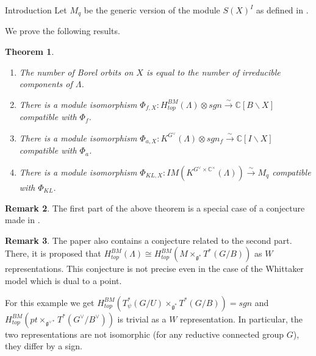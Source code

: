 \documentclass[12pt]{article}
\newcommand{\C}{\mathbb{C}}
\newcommand{\<}{\langle}
\renewcommand{\>}{\rangle}
\theoremstyle{plain}
\newtheorem{theorem}{Theorem}[section]
\theoremstyle{definition}
\newtheorem{Remark}[theorem]{Remark}
\begin{document}
\begin{section}{Introduction}
        Let $M_q$ be the generic version of the module $S(X)^I $ as defined in \cite{my}.
        
        We prove the following results.

        \begin{theorem}\label{relative KL}
            \begin{enumerate}
    \item The number of Borel orbits on $X$ is equal to the number of irreducible components of $\Lambda$.
    
    \item There is a module isomorphism $\Phi_{f,X}:H^{BM}_{top}(\Lambda) \otimes sgn\xrightarrow{\sim} \mathbb{C}[B\backslash X]$ compatible with $\Phi_f$.
    
    \item There is a module isomorphism $\Phi_{a,X}:K^{G^\vee}(\Lambda) \otimes sgn_f\xrightarrow{\sim} \C[I\backslash X]$ compatible with $\Phi_a$. 

    
    \item 
    
    There is a module isomorphism $\Phi_{KL,X}:IM(K^{G^\vee\times\mathbb{C}^\times}(\Lambda))\xrightarrow{\sim} M_q$ compatible with $\Phi_{KL}$. 
\end{enumerate}
        \end{theorem}

       

\begin{Remark}
    The first part of the above theorem is a special case of a conjecture made in \cite{finkelberg2023lagrangiansubvarietieshypersphericalvarieties}.

\end{Remark}

\begin{Remark}
    The paper \cite{finkelberg2023lagrangiansubvarietieshypersphericalvarieties} also contains a conjecture related to the second part. There, it is proposed that $H^{BM}_{top}(\Lambda)\cong H^{BM}_{top}(M\times_{\mathfrak{g}^{*}} T^*(G/B))$ as $W$ representations. This conjecture is not precise even in the case of the Whittaker model which is dual to a point. 
    
    For this example we get $H^{BM}_{top}(T^*_\psi(G/U)\times_{\mathfrak{g}^{*}} T^*(G/B))=sgn$ and $H^{BM}_{top}(pt\times_{\mathfrak{g}^{\vee*}} T^*(G^\vee/B^\vee))$ is trivial as a $W$ representation. In particular, the two representations are not isomorphic (for any reductive connected group $G$), they differ by a sign.


\end{Remark}
\end{section}
\end{document}
